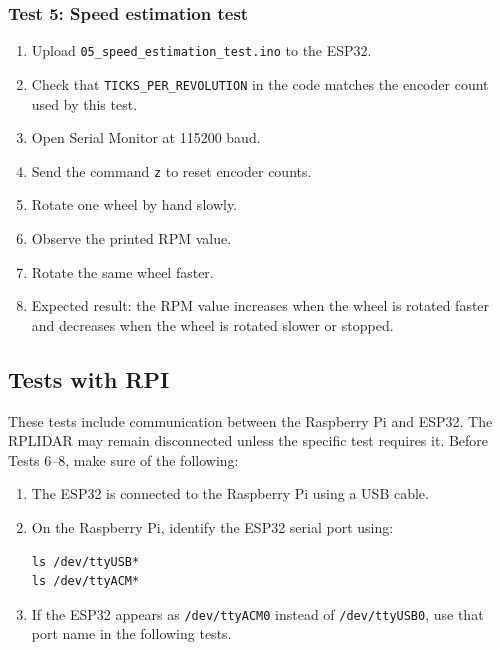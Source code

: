 \documentclass[12pt]{article}
\begin{document}
\subsubsection{Test 5: Speed estimation test}
\begin{enumerate}
    \item Upload \texttt{05\_speed\_estimation\_test.ino} to the ESP32.
    \item Check that \texttt{TICKS\_PER\_REVOLUTION} in the code matches the encoder count used by this test.
    \item Open Serial Monitor at 115200 baud.
    \item Send the command \texttt{z} to reset encoder counts.
    \item Rotate one wheel by hand slowly.
    \item Observe the printed RPM value.
    \item Rotate the same wheel faster.
    \item Expected result: the RPM value increases when the wheel is rotated faster and decreases when the wheel is rotated slower or stopped.
\end{enumerate}
\clearpage
\subsection{Tests with RPI}
These tests include communication between the Raspberry Pi and ESP32. The RPLIDAR may remain disconnected unless the specific test requires it.
Before Tests 6--8, make sure of the following:
\begin{enumerate}
    \item The ESP32 is connected to the Raspberry Pi using a USB cable.
    \item On the Raspberry Pi, identify the ESP32 serial port using:
    \begin{verbatim}
ls /dev/ttyUSB*
ls /dev/ttyACM*
    \end{verbatim}
    \item If the ESP32 appears as \texttt{/dev/ttyACM0} instead of \texttt{/dev/ttyUSB0}, use that port name in the following tests.
\end{enumerate}
\end{document}
